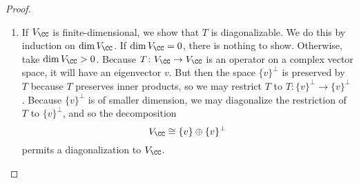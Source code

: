 \documentclass{article}
\begin{document}
\begin{proof}
\begin{enumerate}
        \item If $V_\CC$ is finite-dimensional, we show that $T$ is diagonalizable. We do this by induction on $\dim V_\CC$. If $\dim V_\CC=0$, there is nothing to show. Otherwise, take $\dim V_\CC>0$. Because $T\colon V_\CC\to V_\CC$ is an operator on a complex vector space, it will have an eigenvector $v$. But then the space $\{v\}^\perp$ is preserved by $T$ because $T$ preserves inner products, so we may restrict $T$ to $T\colon\{v\}^\perp\to\{v\}^\perp$. Because $\{v\}^\perp$ is of smaller dimension, we may diagonalize the restriction of $T$ to $\{v\}^\perp$, and so the decomposition
        \[V_\CC\cong\{v\}\oplus\{v\}^\perp\]
        permits a diagonalization to $V_\CC$.
        \qedhere
    \end{enumerate}
\end{proof}
\end{document}

